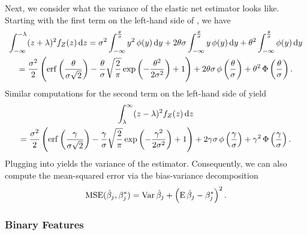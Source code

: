 Next, we consider what the variance of the elastic net estimator looks like.
Starting with the first term on the left-hand side of , we have
\begin{multline}
  \label{eq:mc-var-part1}
  \int_{-\infty}^{-\lambda}(z+ \lambda)^2 f_Z(z) \mathop{}\!\mathrm{d} z = \sigma^2 \int_{-\infty}^{\frac{\theta}{\sigma}} y^2 \operatorname{\phi}(y) \mathop{}\!\mathrm{d} y + 2 \theta \sigma \int_{-\infty}^{\frac{\theta}{\sigma}} y \operatorname{\phi}(y) \mathop{}\!\mathrm{d} y + \theta^2 \int_{-\infty}^{\frac{\theta}{\sigma}} \operatorname{\phi}(y) \mathop{}\!\mathrm{d} y \\
  = \frac{\sigma^2}{2} \left( \operatorname{erf}\left(\frac{\theta}{\sigma\sqrt{2}}\right) - \frac{\theta}{\sigma}\sqrt{\frac{2}{\pi}} \exp\left(-\frac{\theta^2}{2\sigma^2}\right) + 1 \right) + 2 \theta \sigma \operatorname{\phi} \left(\frac{\theta}{\sigma}\right) + \theta^2 \operatorname{\Phi}\left(\frac{\theta}{\sigma}\right).
\end{multline}
Similar computations for the second term on the left-hand side of  yield
\begin{multline}
  \label{eq:mc-var-part2}
  \int_{\lambda}^{\infty}(z - \lambda)^2 f_Z(z) \mathop{}\!\mathrm{d} z \\
  = \frac{\sigma^2}{2} \left( \operatorname{erf}\left(\frac{\gamma}{\sigma\sqrt{2}}\right) - \frac{\gamma}{\sigma}\sqrt{\frac{2}{\pi}} \exp\left(-\frac{\gamma^2}{2\sigma^2}\right) + 1 \right) + 2 \gamma \sigma \operatorname{\phi} \left(\frac{\gamma}{\sigma}\right) + \gamma^2 \operatorname{\Phi}\left(\frac{\gamma}{\sigma}\right).
\end{multline}
Plugging  into  yields the variance of the estimator. Consequently, we can also compute the mean-squared error via the bias-variance decomposition
\begin{equation}
  \label{eq:betahat-mse}
  \operatorname{MSE} (\hat\beta_j, \beta^*_j) = \operatorname{Var}\hat\beta_j + \left(\operatorname{E} \hat\beta_j - \beta^*_j\right)^2.
\end{equation}

\subsubsection{Binary Features}

